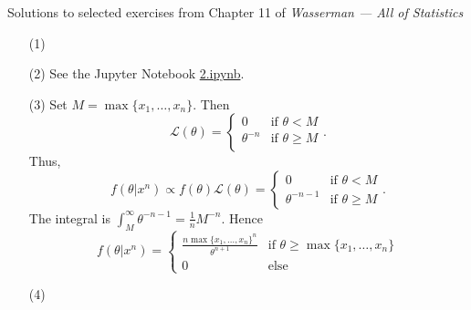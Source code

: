 \documentclass[10pt]{article}
\begin{document}
\noindent \large{Solutions to selected exercises from Chapter 11 of
\emph{Wasserman --- All of Statistics}}

\begin{enumerate}[(1)]
\item[(1)]

\item[(2)]
See the Jupyter Notebook
\href{https://github.com/ajrasmus/some_of_statistics/blob/main/chapter_11/2.ipynb}{2.ipynb}.


\item[(3)] Set $M=\max\{x_1,\ldots,x_n\}$. Then
\[
    \mathcal L(\theta) = \begin{cases}
        0 & \text{if } \theta < M \\
        \theta^{-n} & \text{if } \theta \geq M \\
    \end{cases}.
\]
Thus,
\[
    f(\theta | x^n) \propto f(\theta)\mathcal L(\theta) =
    \begin{cases}
        0 & \text{if } \theta < M \\
        \theta^{-n-1} & \text{if } \theta \geq M
    \end{cases}.
\]
The integral is $\int_M^\infty \theta^{-n-1} = \frac{1}{n}M^{-n}$.
Hence
\[
    f(\theta|x^n) = \begin{cases}
        \frac{n\max\{x_1,\ldots,x_n\}^n}{\theta^{n+1}} &
        \text{if } \theta \geq \max\{x_1,\ldots,x_n\} \\
        0 & \text{else }
    \end{cases}
\]

\item[(4)]
\end{enumerate}
\end{document}
